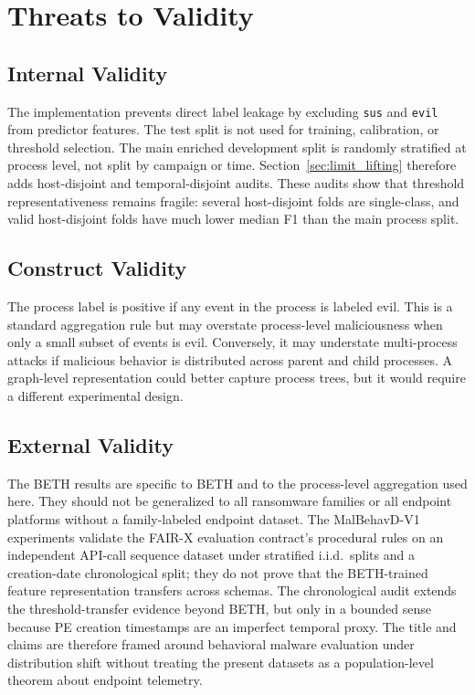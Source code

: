 \documentclass[10pt,journal,compsoc]{IEEEtran}
\begin{document}
\section{Threats to Validity}
\label{sec:validity}

\subsection{Internal Validity}

The implementation prevents direct label leakage by excluding \texttt{sus} and \texttt{evil} from predictor features. The test split is not used for training, calibration, or threshold selection. The main enriched development split is randomly stratified at process level, not split by campaign or time. Section~\ref{sec:limit_lifting} therefore adds host-disjoint and temporal-disjoint audits. These audits show that threshold representativeness remains fragile: several host-disjoint folds are single-class, and valid host-disjoint folds have much lower median F1 than the main process split.

\subsection{Construct Validity}

The process label is positive if any event in the process is labeled evil. This is a standard aggregation rule but may overstate process-level maliciousness when only a small subset of events is evil. Conversely, it may understate multi-process attacks if malicious behavior is distributed across parent and child processes. A graph-level representation could better capture process trees, but it would require a different experimental design.

\subsection{External Validity}

The BETH results are specific to BETH and to the process-level aggregation used here. They should not be generalized to all ransomware families or all endpoint platforms without a family-labeled endpoint dataset. The MalBehavD-V1 experiments validate the FAIR-X evaluation contract's procedural rules on an independent API-call sequence dataset under stratified i.i.d.\ splits and a creation-date chronological split; they do not prove that the BETH-trained feature representation transfers across schemas. The chronological audit extends the threshold-transfer evidence beyond BETH, but only in a bounded sense because PE creation timestamps are an imperfect temporal proxy. The title and claims are therefore framed around behavioral malware evaluation under distribution shift without treating the present datasets as a population-level theorem about endpoint telemetry.
\end{document}
